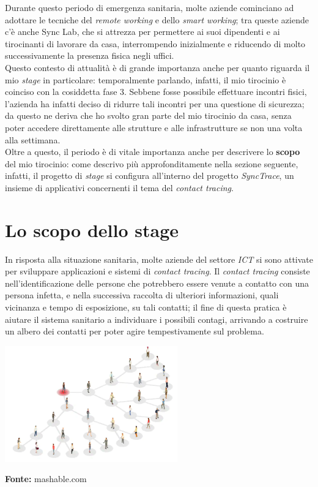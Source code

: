 Durante questo periodo di emergenza sanitaria, molte aziende cominciano ad adottare le tecniche del \textit{remote working} e dello \textit{smart working}; tra queste aziende c'è anche Sync Lab, che si attrezza per permettere ai suoi dipendenti e ai tirocinanti di lavorare da casa, interrompendo inizialmente e riducendo di molto successivamente la presenza fisica negli uffici. \\
Questo contesto di attualità è di grande importanza anche per quanto riguarda il mio \textit{stage} in particolare: temporalmente parlando, infatti, il mio tirocinio è coinciso con la cosiddetta fase 3. Sebbene fosse possibile effettuare incontri fisici, l'azienda ha infatti deciso di ridurre tali incontri per una questione di sicurezza; da questo ne deriva che ho svolto gran parte del mio tirocinio da casa, senza poter accedere direttamente alle strutture e alle infrastrutture se non una volta alla settimana. \\
Oltre a questo, il periodo è di vitale importanza anche per descrivere lo \textbf{scopo} del mio tirocinio: come descrivo più approfonditamente nella sezione seguente, infatti, il progetto di \textit{stage} si configura all'interno del progetto \textit{SyncTrace}, un insieme di applicativi concernenti il tema del \textit{contact tracing}.


\section{Lo scopo dello stage}

In risposta alla situazione sanitaria, molte aziende del settore \textit{ICT} si sono attivate per sviluppare applicazioni e sistemi di \textit{contact tracing}. Il \textit{contact tracing} consiste nell'identificazione delle persone che potrebbero essere venute a contatto con una persona infetta, e nella successiva raccolta di ulteriori informazioni, quali vicinanza e tempo di esposizione, su tali contatti; il fine di questa pratica è aiutare il sistema sanitario a individuare i possibili contagi, arrivando a costruire un albero dei contatti per poter agire tempestivamente sul problema. \\

\begin{minipage}{\linewidth}
  \centering
    \includegraphics[height=5cm]{immagini/contacttracing}
  \caption*{\textbf{Fonte:} mashable.com}
\end{minipage} \\


